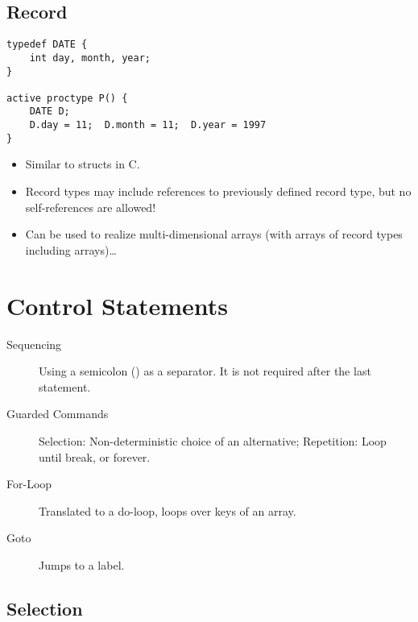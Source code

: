		\subsection{Record}
			\begin{lstlisting}[caption = { PROMELA Records }, label = lst:promelaRecord, language = PROMELA]
typedef DATE {
	int day, month, year;
}

active proctype P() {
	DATE D;
	D.day = 11;  D.month = 11;  D.year = 1997
}
			\end{lstlisting}
			
			\begin{itemize}
				\item Similar to structs in C.
				\item Record types may include references to previously defined record type, but no self-references are allowed!
				\item Can be used to realize multi-dimensional arrays (with arrays of record types including arrays)\dots
			\end{itemize}

	\section{Control Statements}
		\begin{description}
			\item[Sequencing] Using a semicolon (\inlinePromela{;}) as a separator. It is not required after the last statement.
			\item[Guarded Commands] Selection: Non-deterministic choice of an alternative; Repetition: Loop until break, or forever.
			\item[For-Loop] Translated to a do-loop, loops over keys of an array.
			\item[Goto] Jumps to a label.
		\end{description}

		\subsection{Selection}
			
			
